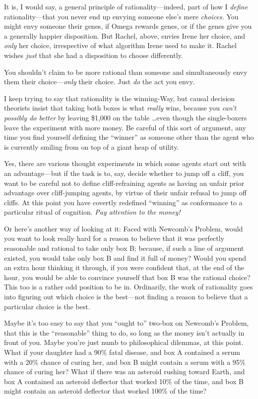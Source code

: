 {
 It is, I would say, a general principle of rationality---indeed,
part of how I \textit{define} rationality---that you never end up
envying someone else's mere \textit{choices.} You might
envy someone their genes, if Omega rewards genes, or if the genes give
you a generally happier disposition. But Rachel, above, envies Irene
her choice, and \textit{only} her choice, irrespective of what
algorithm Irene used to make it. Rachel wishes \textit{just} that she
had a disposition to choose differently.}

{
 You shouldn't claim to be more rational than
someone and simultaneously envy them their choice---\textit{only} their
choice. Just \textit{do} the act you envy.}

{
 I keep trying to say that rationality is the winning-Way, but
causal decision theorists insist that taking both boxes is what
\textit{really} wins, because you \textit{can't
possibly do better} by leaving \$1,000 on the table \ldots even though
the single-boxers leave the experiment with more money. Be careful of
this sort of argument, any time you find yourself defining the
``winner'' as someone other than the
agent who is currently smiling from on top of a giant heap of utility.}

{
 Yes, there are various thought experiments in which some agents
start out with an advantage---but if the task is to, say, decide
whether to jump off a cliff, you want to be careful not to define
cliff-refraining agents as having an unfair prior advantage over
cliff-jumping agents, by virtue of their unfair refusal to jump off
cliffs. At this point you have covertly redefined
``winning'' as conformance to a
particular ritual of cognition. \textit{Pay attention to the money!}}

{
 Or here's another way of looking at it: Faced with
Newcomb's Problem, would you want to look really hard
for a reason to believe that it was perfectly reasonable and rational
to take only box B; because, if such a line of argument existed, you
would take only box B and find it full of money? Would you spend an
extra hour thinking it through, if you were confident that, at the end
of the hour, you would be able to convince yourself that box B was the
rational choice? This too is a rather odd position to be in.
Ordinarily, the work of rationality goes into figuring out which choice
is the best---not finding a reason to believe that a particular choice
is the best.}

{
 Maybe it's too easy to say that you
``ought to'' two-box on
Newcomb's Problem, that this is the
``reasonable'' thing to do, so long
as the money isn't actually in front of you. Maybe
you're just numb to philosophical dilemmas, at this
point. What if your daughter had a 90\% fatal disease, and box A
contained a serum with a 20\% chance of curing her, and box B might
contain a serum with a 95\% chance of curing her? What if there was an
asteroid rushing toward Earth, and box A contained an asteroid
deflector that worked 10\% of the time, and box B might contain an
asteroid deflector that worked 100\% of the time?}

